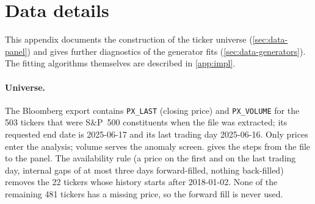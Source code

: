 \section{Data details}\label{app:data}

This appendix documents the construction of the ticker universe (\cref{sec:data-panel}) and
gives further diagnostics of the generator fits (\cref{sec:data-generators}). The fitting
algorithms themselves are described in \cref{app:impl}.

\paragraph{Universe.}
The Bloomberg export contains \texttt{PX\_LAST} (closing price) and \texttt{PX\_VOLUME} for the
503 tickers that were S\&P~500 constituents when the file was extracted; its requested end date
is 2025-06-17 and its last trading day 2025-06-16. Only prices enter the analysis; volume
serves the anomaly screen.
 gives the steps from the file to the panel. The availability rule
(a price on the first and on the last trading day, internal gaps of at most three days
forward-filled, nothing back-filled) removes the 22 tickers whose history starts after
2018-01-02. None of the remaining 481 tickers has a missing price, so the forward fill is never
used.

\begin{table}[tbp]
  \centering
  \caption{Construction of the ticker universe from the Bloomberg export.}
  \label{tab:data-universe}
  \small
\end{table}

